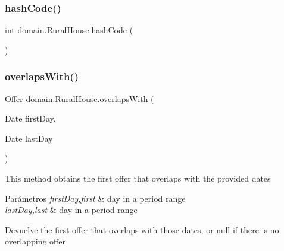 \mbox{\label{classdomain_1_1_rural_house_a23272d170821f464d6b07595303c283e}} 
\subsubsection{\texorpdfstring{hashCode()}{hashCode()}}
{\footnotesize\ttfamily int domain.\+Rural\+House.\+hash\+Code (\begin{DoxyParamCaption}{ }\end{DoxyParamCaption})}

\mbox{\label{classdomain_1_1_rural_house_ac5596b06728d8bf377993088520fbc9e}} 
\subsubsection{\texorpdfstring{overlapsWith()}{overlapsWith()}}
{\footnotesize\ttfamily \mbox{\hyperlink{classdomain_1_1_offer}{Offer}} domain.\+Rural\+House.\+overlaps\+With (\begin{DoxyParamCaption}\item[{Date}]{first\+Day,  }\item[{Date}]{last\+Day }\end{DoxyParamCaption})}

This method obtains the first offer that overlaps with the provided dates


\begin{DoxyParams}{Parámetros}
{\em first\+Day,first} & day in a period range \\
\hline
{\em last\+Day,last} & day in a period range \\
\hline
\end{DoxyParams}
\begin{DoxyReturn}{Devuelve}
the first offer that overlaps with those dates, or null if there is no overlapping offer 
\end{DoxyReturn}
\mbox{\label{classdomain_1_1_rural_house_a04f87e3266ab2b0d9b42bb8f947d6172}} 
